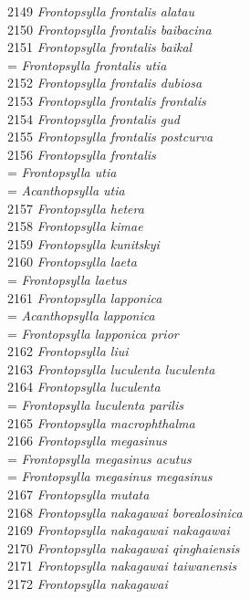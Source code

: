 \documentclass[
]{article}
\begin{document}
2149 \emph{Frontopsylla frontalis alatau}\\
2150 \emph{Frontopsylla frontalis baibacina}\\
2151 \emph{Frontopsylla frontalis baikal}\\
= \emph{Frontopsylla frontalis utia}\\
2152 \emph{Frontopsylla frontalis dubiosa}\\
2153 \emph{Frontopsylla frontalis frontalis}\\
2154 \emph{Frontopsylla frontalis gud}\\
2155 \emph{Frontopsylla frontalis postcurva}\\
2156 \emph{Frontopsylla frontalis}\\
= \emph{Frontopsylla utia}\\
= \emph{Acanthopsylla utia}\\
2157 \emph{Frontopsylla hetera}\\
2158 \emph{Frontopsylla kimae}\\
2159 \emph{Frontopsylla kunitskyi}\\
2160 \emph{Frontopsylla laeta}\\
= \emph{Frontopsylla laetus}\\
2161 \emph{Frontopsylla lapponica}\\
= \emph{Acanthopsylla lapponica}\\
= \emph{Frontopsylla lapponica prior}\\
2162 \emph{Frontopsylla liui}\\
2163 \emph{Frontopsylla luculenta luculenta}\\
2164 \emph{Frontopsylla luculenta}\\
= \emph{Frontopsylla luculenta parilis}\\
2165 \emph{Frontopsylla macrophthalma}\\
2166 \emph{Frontopsylla megasinus}\\
= \emph{Frontopsylla megasinus acutus}\\
= \emph{Frontopsylla megasinus megasinus}\\
2167 \emph{Frontopsylla mutata}\\
2168 \emph{Frontopsylla nakagawai borealosinica}\\
2169 \emph{Frontopsylla nakagawai nakagawai}\\
2170 \emph{Frontopsylla nakagawai qinghaiensis}\\
2171 \emph{Frontopsylla nakagawai taiwanensis}\\
2172 \emph{Frontopsylla nakagawai}\\
\end{document}
